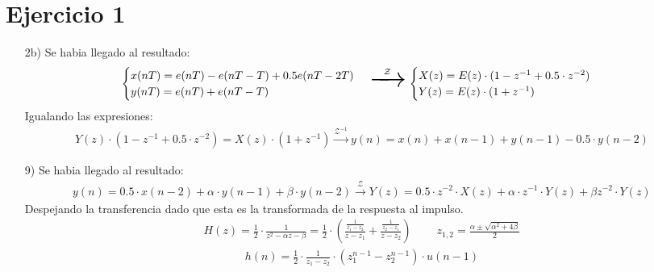 
\usepackage{amsmath}







\section*{Ejercicio 1}
\begin{itemize}
	\item[2b)] 
	Se habia llegado al resultado:
	\begin{align}
 \begin{cases} 
      x(nT) = e(nT) -  e(nT - T)+0.5e(nT - 2T)    \\
      y(nT) = e(nT) + e(nT - T) 
   \end{cases} 
   \begin{Huge}
   \xrightarrow{\mathcal{Z}}
   \end{Huge} 
    \begin{cases} 
      X(z) = E(z) \cdot (1-  z^{-1}+ 0.5 \cdot  z^{-2}) \\
      Y(z) = E(z)\cdot (1 +  z^{-1})
   \end{cases}
	\end{align}
Igualando las expresiones:
\begin{align}
Y(z) \cdot (1-  z^{-1}+ 0.5 \cdot  z^{-2}) = X(z) \cdot (1 +  z^{-1})\xrightarrow{\mathcal{Z}^{-1}}
y(n) = x(n) + x(n-1)+y(n-1) -0.5 \cdot y(n-2) 
\end{align}
\item[9)] 	Se habia llegado al resultado:
	\begin{align}
	y(n)= 0.5 \cdot x(n-2) + \alpha  \cdot y(n-1) + \beta  \cdot y(n-2)    \xrightarrow{\mathcal{Z}} Y(z) = 0.5 \cdot z^{-2} \cdot X(z) + \alpha  \cdot z^{-1} \cdot Y(z) + \beta z^{-2}  \cdot Y(z) 
	\end{align}
	Despejando la transferencia dado que esta es la transformada de la respuesta al impulso.
	\begin{align}
	H(z)=\frac{1}{2}\cdot \frac{1}{z^2-\alpha z - \beta} = \frac{1}{2}\cdot \left( \frac{\frac{1}{z_1-z_2}}{z-z_1} + \frac{\frac{1}{z_2-z_1}}{z-z_2} \right) \ \ \ \ \ \ \ \ \ \ z_{1,2}=\frac{\alpha \pm \sqrt{\alpha ^2 + 4\beta} }{2}
		\end{align}
		\begin{align}
	h(n)=\frac{1}{2}\cdot \frac{1}{z_1-z_2}\cdot (z_1^{n-1}-z_2^{n-1})\cdot u(n-1)
	\end{align}
\end{itemize}	
